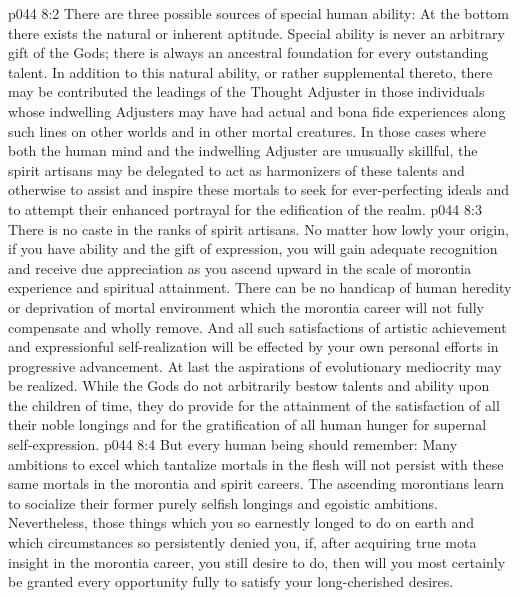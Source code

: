 \vs p044 8:2 There are three possible sources of special human ability: At the bottom  there exists the natural or inherent aptitude. Special ability is never an arbitrary gift of the Gods; there is always an ancestral foundation for every outstanding talent. In addition to this natural ability, or rather supplemental thereto, there may be contributed the leadings of the Thought Adjuster in those individuals whose indwelling Adjusters may have had actual and bona fide experiences along such lines on other worlds and in other mortal creatures. In those cases where both the human mind and the indwelling Adjuster are unusually skillful, the spirit artisans may be delegated to act as harmonizers of these talents and otherwise to assist and inspire these mortals to seek for ever\hyp{}perfecting ideals and to attempt their enhanced portrayal for the edification of the realm.
\pc \vs p044 8:3 There is no caste in the ranks of spirit artisans. No matter how lowly your origin, if you have ability and the gift of expression, you will gain adequate recognition and receive due appreciation as you ascend upward in the scale of morontia experience and spiritual attainment. There can be no handicap of human heredity or deprivation of mortal environment which the morontia career will not fully compensate and wholly remove. And all such satisfactions of artistic achievement and expressionful self\hyp{}realization will be effected by your own personal efforts in progressive advancement. At last the aspirations of evolutionary mediocrity may be realized. While the Gods do not arbitrarily bestow talents and ability upon the children of time, they do provide for the attainment of the satisfaction of all their noble longings and for the gratification of all human hunger for supernal self\hyp{}expression.
\vs p044 8:4 But every human being should remember: Many ambitions to excel which tantalize mortals in the flesh will not persist with these same mortals in the morontia and spirit careers. The ascending morontians learn to socialize their former purely selfish longings and egoistic ambitions. Nevertheless, those things which you so earnestly longed to do on earth and which circumstances so persistently denied you, if, after acquiring true mota insight in the morontia career, you still desire to do, then will you most certainly be granted every opportunity fully to satisfy your long\hyp{}cherished desires.
